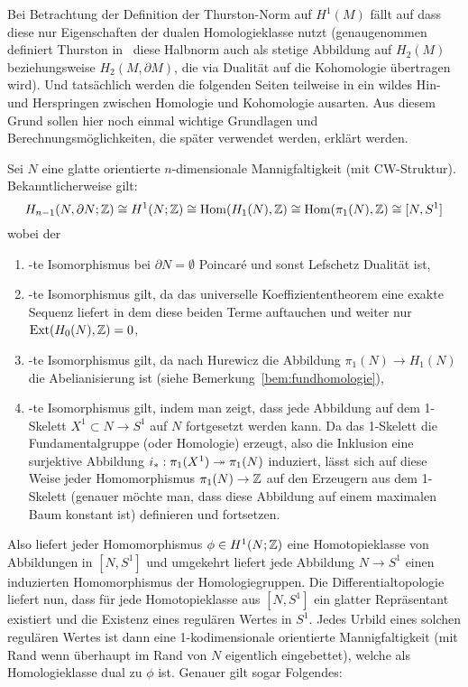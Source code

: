 	Bei Betrachtung der Definition der Thurston-Norm auf $H^1(M)$ fällt auf dass diese nur Eigenschaften der dualen Homologieklasse nutzt (genaugenommen definiert Thurston in~\cite{Thurston.1986} diese Halbnorm auch als stetige Abbildung auf $H_2(M)$ beziehungsweise $H_2(M,\partial M)$, die via Dualität auf die Kohomologie übertragen wird). Und tatsächlich werden die folgenden Seiten teilweise in ein wildes Hin- und Herspringen zwischen Homologie und Kohomologie ausarten. Aus diesem Grund sollen hier noch einmal wichtige Grundlagen und Berechnungsmöglichkeiten, die später verwendet werden, erklärt werden.
	\begin{bem}
	Sei $N$ eine glatte orientierte $n$-dimensionale Mannigfaltigkeit (mit CW-Struktur).
		Bekanntlicherweise gilt:
		\[
					H_{n-1}(N,\partial N;\mathbb{Z})\cong H^1(N;\mathbb{Z}) \cong \operatorname{Hom}(H_1(N),\mathbb{Z}) \cong \operatorname{Hom}(\pi_1(N),\mathbb{Z}) \cong  [N,S^1]
		\]		
		wobei der
		\begin{enumerate}
			\item -te Isomorphismus bei $\partial N= \emptyset$ Poincaré und sonst Lefschetz Dualität ist,
			\item -te Isomorphismus gilt, da das universelle Koeffiziententheorem eine exakte Sequenz liefert in dem diese beiden Terme auftauchen und weiter nur $\operatorname{Ext}(H_0(N),\mathbb{Z}) = 0$,
			\item -te Isomorphismus gilt, da nach Hurewicz die Abbildung $\pi_1(N)\to H_1(N)$ die Abelianisierung ist (siehe Bemerkung~\ref{bem:fundhomologie}),
			\item -te Isomorphismus gilt, indem man zeigt, dass jede Abbildung auf dem 1-Skelett $X^1 \subset N \to S^1$ auf $N$ fortgesetzt werden kann. Da das 1-Skelett die Fundamentalgruppe (oder Homologie) erzeugt, also die Inklusion eine surjektive Abbildung $i_*:\pi_1(X^1)\twoheadrightarrow\pi_1(N)$ induziert, lässt sich auf diese Weise jeder Homomorphismus $\pi_1(N)\to \mathbb{Z}$ auf den Erzeugern aus dem 1-Skelett (genauer möchte man, dass diese Abbildung auf einem maximalen Baum konstant ist) definieren und fortsetzen. 
		\end{enumerate}
	Also liefert jeder Homomorphismus $\phi \in H^1(N;\mathbb{Z})$ eine Homotopieklasse von Abbildungen in $[N,S^1]$ und umgekehrt liefert jede Abbildung $N\to S^1$ einen induzierten Homomorphismus der Homologiegruppen. Die Differentialtopologie liefert nun, dass für jede Homotopieklasse aus $[N,S^1]$ ein glatter Repräsentant existiert und die Existenz eines regulären Wertes in $S^1$. Jedes Urbild eines solchen regulären Wertes ist dann eine 1-kodimensionale orientierte Mannigfaltigkeit (mit Rand wenn überhaupt im Rand von $N$ eigentlich eingebettet), welche als Homologieklasse dual zu $\phi$ ist. Genauer gilt sogar Folgendes:
	\end{bem}
